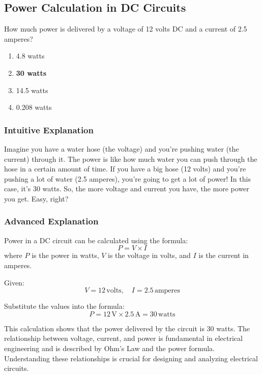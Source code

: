 \subsection{Power Calculation in DC Circuits}
\label{T5C10}

\begin{tcolorbox}[colback=gray!10!white,colframe=black!75!black,title=T5C10]
How much power is delivered by a voltage of 12 volts DC and a current of 2.5 amperes?
\begin{enumerate}[label=\Alph*)]
    \item 4.8 watts
    \item \textbf{30 watts}
    \item 14.5 watts
    \item 0.208 watts
\end{enumerate}
\end{tcolorbox}

\subsubsection{Intuitive Explanation}
Imagine you have a water hose (the voltage) and you're pushing water (the current) through it. The power is like how much water you can push through the hose in a certain amount of time. If you have a big hose (12 volts) and you're pushing a lot of water (2.5 amperes), you're going to get a lot of power! In this case, it's 30 watts. So, the more voltage and current you have, the more power you get. Easy, right?

\subsubsection{Advanced Explanation}
Power in a DC circuit can be calculated using the formula:
\[
P = V \times I
\]
where \( P \) is the power in watts, \( V \) is the voltage in volts, and \( I \) is the current in amperes.

Given:
\[
V = 12 \, \text{volts}, \quad I = 2.5 \, \text{amperes}
\]

Substitute the values into the formula:
\[
P = 12 \, \text{V} \times 2.5 \, \text{A} = 30 \, \text{watts}
\]

This calculation shows that the power delivered by the circuit is 30 watts. The relationship between voltage, current, and power is fundamental in electrical engineering and is described by Ohm's Law and the power formula. Understanding these relationships is crucial for designing and analyzing electrical circuits.

